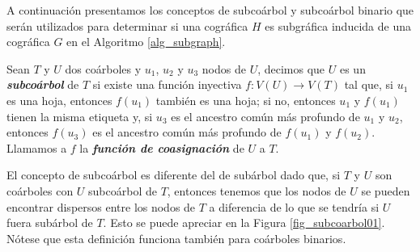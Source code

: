 A continuación presentamos los conceptos de subcoárbol y subcoárbol binario
que serán utilizados para determinar si una cográfica $H$ es subgráfica
inducida de una cográfica $G$ en el Algoritmo \ref{alg_subgraph}.

Sean $T$ y $U$ dos coárboles y $u_1$, $u_2$ y $u_3$ nodos de $U$, decimos
que $U$ es un \emph{\textbf{subcoárbol}} de $T$ si existe una función
inyectiva $f:V(U)\rightarrow V(T)$ tal que, si $u_1$ es una hoja, entonces
$f(u_1)$ tambi\'en es una hoja; si no, entonces $u_1$ y $f(u_1)$ tienen la
misma etiqueta y, si $u_3$ es el ancestro común más profundo de $u_1$ y
$u_2$, entonces $f(u_3)$ es el ancestro común más profundo de $f(u_1)$ y
$f(u_2)$. Llamamos a $f$ la \textbf{\emph{función de coasignación}} de $U$ a
$T$.

El concepto de subcoárbol es diferente del de subárbol dado que, si $T$ y $U$
son coárboles con $U$ subcoárbol de $T$, entonces tenemos que los nodos de $U$
se pueden encontrar dispersos entre los nodos de $T$ a diferencia de lo que se
tendría si $U$ fuera subárbol de $T$. Esto se puede apreciar en la Figura
\ref{fig_subcoarbol01}. N\'otese que esta definición funciona también para
coárboles binarios.


